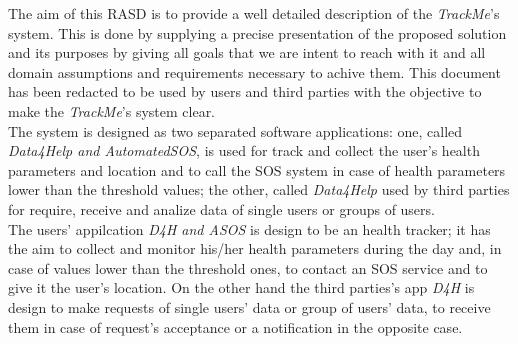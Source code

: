 The aim of this RASD is to provide a well detailed description of the \textit{TrackMe}'s system.
This is done by supplying a precise presentation of the proposed solution and its purposes by giving all goals that we are intent to reach with it and all domain assumptions and requirements necessary to achive them.
This document has been redacted to be used by users and third parties with the objective to make the \textit{TrackMe}'s system clear.\vspace{0.5cm}\\The system is designed as two separated software applications: one, called \textit{Data4Help and AutomatedSOS}, is used for track and collect the user's health parameters and location and to call the SOS system in case of health parameters lower than the threshold values; the other, called \textit{Data4Help} used by third parties for require, receive and analize data of single users or groups of users.\\
The users' appilcation \textit{D4H and ASOS} is design to be an health tracker; it has the aim to collect and monitor his/her health parameters during the day and, in case of values lower than the threshold ones, to contact an SOS service and to give it the user's location. On the other hand the third parties's app \textit{D4H} is design to make requests of single users' data or group of users' data, to receive them in case of request's acceptance or a notification in the opposite case.